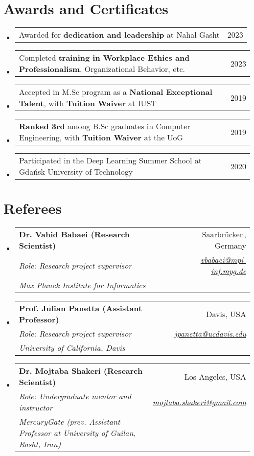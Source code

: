 \documentclass[letterpaper,11pt]{article}
\makeatletter
\newcommand{\resumeSubheading}[5]{
  \item
    \begin{tabular*}{0.97\textwidth}{l@{\extracolsep{\fill}}r}
      \textbf{#1} & #2 \\ 
      \textit{\small#3} & \textit{\small #4} \\
      \textit{#5} & 
    \end{tabular*}\vspace{-5pt}
}
\newcommand{\awarditem}[2]{
  \item
    \begin{tabular*}{0.97\textwidth}{l@{\extracolsep{\fill}}r}
      #1 & #2 \\ 
    \end{tabular*}\vspace{-5pt}
}
\newcommand{\resumeSubHeadingListStart}{\begin{itemize}[leftmargin=*]}
\newcommand{\resumeSubHeadingListEnd}{\end{itemize}}
\newcommand{\awarditemListStart}{\begin{itemize}[leftmargin=*]}
\newcommand{\awarditemListEnd}{\end{itemize}\vspace{-5pt}}
\makeatother
\begin{document}
\section{Awards and Certificates}
\awarditemListStart
  \awarditem{Awarded for \textbf{dedication and leadership} at Nahal Gasht}{2023}
  \awarditem{Completed \textbf{training in Workplace Ethics and Professionalism}, Organizational Behavior, etc.}{2023}
  \awarditem{Accepted in M.Sc program as a \textbf{National Exceptional Talent}, with \textbf{Tuition Waiver} at IUST}{2019}
  \awarditem{\textbf{Ranked 3rd} among B.Sc graduates in Computer Engineering, with \textbf{Tuition Waiver} at the UoG}{2019}
  \awarditem{Participated in the Deep Learning Summer School at Gda\'{n}sk University of Technology}{2020}

\awarditemListEnd

\section{Referees}
  \resumeSubHeadingListStart
    \resumeSubheading
      {Dr. Vahid Babaei (Research Scientist)}{Saarbr{\"u}cken, Germany}
       {Role: Research project supervisor}
      {\href{mailto:vbabaei@mpi-inf.mpg.de}{vbabaei@mpi-inf.mpg.de}}{Max Planck Institute for Informatics}

    \resumeSubheading
      {Prof. Julian Panetta (Assistant Professor)}{Davis, USA}
       {Role: Research project supervisor}
      {\href{mailto:jpanetta@ucdavis.edu}{jpanetta@ucdavis.edu}}{University of California, Davis}
    
    \resumeSubheading
      {Dr. Mojtaba Shakeri (Research Scientist)}{Los Angeles, USA}
       {Role: Undergraduate mentor and instructor}
      {\href{mailto:mojtaba.shakeri@gmail.com}{mojtaba.shakeri@gmail.com}}{MercuryGate (prev. Assistant Professor at University of Guilan, Rasht, Iran)}
  \resumeSubHeadingListEnd
\end{document}
